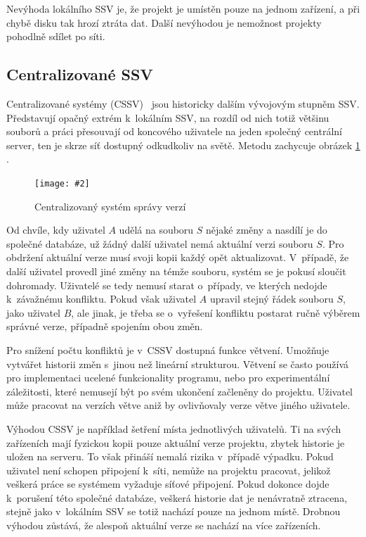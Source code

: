 \documentclass[
  biblatex,
  glossaries,
  index
]{kidiplom}
\newcommand{\pic}[4]{
\begin{figure}[h]
\centering
\texttt{[image: \#2]}
\caption{#3}
\label{fig:#4}
\end{figure}}
\begin{document}
Nevýhoda lokálního SSV je, že projekt je umístěn pouze na jednom 
zařízení, a při chybě disku tak hrozí ztráta dat. Další nevýhodou je 
nemožnost projekty pohodlně sdílet po síti.

\subsection{Centralizované SSV}
Centralizované systémy (CSSV)~\cite{otte} jsou historicky dalším vývojovým stupněm SSV. 
Představují opačný extrém k~lokálním SSV, na rozdíl od nich totiž 
většinu souborů a práci přesouvají od koncového uživatele na jeden 
společný centrální server, ten je skrze síť dostupný odkudkoliv na světě. Metodu zachycuje obrázek \ref{fig:centralized} \cite{gitreference}.

\pic{10cm}{centralized.png}{Centralizovaný systém správy verzí}{centralized}

Od chvíle, kdy uživatel $A$ udělá na souboru $S$ nějaké změny a nasdílí
je do společné databáze, už žádný další uživatel nemá aktuální
verzi souboru $S$.
Pro obdržení aktuální verze musí svoji kopii každý opět aktualizovat.
V~případě, že další uživatel provedl jiné změny na témže souboru,
systém se je pokusí sloučit dohromady. Uživatelé se tedy nemusí starat
o~případy, ve kterých nedojde k~závažnému konfliktu. Pokud však uživatel $A$ 
upravil stejný řádek souboru $S$, jako uživatel $B$, ale jinak, je třeba se 
o~vyřešení konfliktu postarat ručně výběrem správné verze, případně
spojením obou změn.

Pro snížení počtu konfliktů je v~CSSV dostupná funkce větvení. Umožňuje 
vytvářet historii změn s~jinou než lineární strukturou. Větvení se často
používá pro implementaci ucelené funkcionality programu, nebo pro 
experimentální záležitosti, které nemusejí být po svém ukončení začleněny 
do projektu. Uživatel může pracovat na verzích větve aniž by ovlivňovaly
verze větve jiného uživatele.

Výhodou CSSV je například
šetření místa jednotlivých uživatelů. Ti na svých zařízeních mají fyzickou 
kopii pouze aktuální verze projektu, zbytek historie je uložen na serveru.
To však přináší nemalá rizika v~případě výpadku. Pokud uživatel není
schopen připojení k~síti, nemůže na projektu pracovat, jelikož veškerá
práce se systémem vyžaduje síťové připojení. Pokud dokonce dojde
k~porušení této společné databáze, veškerá historie dat je nenávratně
ztracena, stejně jako v~lokálním SSV se totiž nachází pouze na jednom místě. Drobnou výhodou 
zůstává, že alespoň aktuální verze se nachází na více zařízeních.
\end{document}
